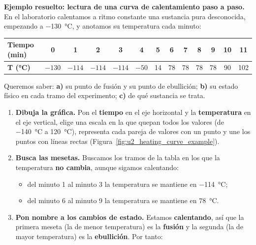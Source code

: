 \begin{example}
    \textbf{Ejemplo resuelto: lectura de una curva de calentamiento paso a paso.} En el laboratorio calentamos a ritmo constante una sustancia pura desconocida, empezando a \qty{-130}{\celsius}, y anotamos su temperatura cada minuto:
    \begin{center}
        \renewcommand{\arraystretch}{1.3}
        \begin{tabular}{@{}lcccccccccccc@{}}
            \toprule
            \textbf{Tiempo (min)} & \textbf{0} & \textbf{1} & \textbf{2} & \textbf{3} & \textbf{4} & \textbf{5} & \textbf{6} & \textbf{7} & \textbf{8} & \textbf{9} & \textbf{10} & \textbf{11} \\
            \midrule
            \textbf{T (\unit{\celsius})} & \(-130\) & \(-114\) & \(-114\) & \(-114\) & \(-50\) & 14 & 78 & 78 & 78 & 78 & 90 & 102 \\
            \bottomrule
        \end{tabular}
    \end{center}
    Queremos saber: \textbf{a)} su punto de fusión y su punto de ebullición; \textbf{b)} su estado físico en cada tramo del experimento; \textbf{c)} de qué sustancia se trata.
    \begin{enumerate}[label=\numberballmDarkTeal]
        \item \textbf{Dibuja la gráfica.} Pon el \textbf{tiempo} en el eje horizontal y la \textbf{temperatura} en el eje vertical, elige una escala en la que quepan todos los valores (de \qty{-140}{\celsius} a \qty{120}{\celsius}), representa cada pareja de valores con un punto y une los puntos con líneas rectas (Figura~\ref{fig:u2_heating_curve_example}).
        \item \textbf{Busca las mesetas.} Buscamos los tramos de la tabla en los que la temperatura \textbf{no cambia}, aunque sigamos calentando:
        \begin{itemize}
            \item del minuto 1 al minuto 3 la temperatura se mantiene en \qty{-114}{\celsius};
            \item del minuto 6 al minuto 9 la temperatura se mantiene en \qty{78}{\celsius}.
        \end{itemize}
        \item \textbf{Pon nombre a los cambios de estado.} Estamos \textbf{calentando}, así que la primera meseta (la de menor temperatura) es la \textbf{fusión} y la segunda (la de mayor temperatura) es la \textbf{ebullición}. Por tanto:
        \[
\]
\end{enumerate}
\end{example}
